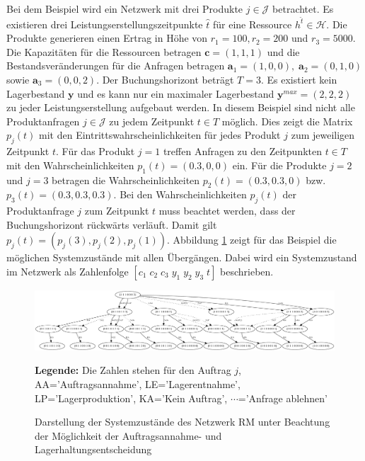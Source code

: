 Bei dem Beispiel wird ein Netzwerk mit drei Produkte $j\in\mathcal{J}$ betrachtet. Es existieren drei Leistungserstellungszeitpunkte $\hat t$ für eine Ressource $h^{\hat t}\in\mathcal{H}$. Die Produkte generieren einen Ertrag in Höhe von $r_1=100, r_2=200$ und $r_3=5000$. Die Kapazitäten für die Ressourcen betragen $\textbf{c}=(1,1,1)$ und die Bestandsveränderungen für die Anfragen betragen $\textbf{a}_1=(1,0,0),\; \textbf{a}_2=(0,1,0)$ sowie $\textbf{a}_3=(0,0,2)$. Der Buchungshorizont beträgt $T=3$. Es existiert kein Lagerbestand $\textbf{y}$ und es kann nur ein maximaler Lagerbestand $\textbf{y}^{max}=(2, 2, 2)$ zu jeder Leistungserstellung aufgebaut werden. In diesem Beispiel sind nicht alle Produktanfragen $j\in\mathcal{J}$ zu jedem Zeitpunkt $t\in T$ möglich. Dies zeigt die Matrix $p_{j}(t)$ mit den Eintrittswahrscheinlichkeiten für jedes Produkt $j$ zum jeweiligen Zeitpunkt $t$. Für das Produkt $j=1$ treffen Anfragen zu den Zeitpunkten $t\in T$ mit den Wahrscheinlichkeiten $p_{1}(t)=(0.3, 0, 0)$ ein. Für die Produkte $j=2$ und $j=3$ betragen die Wahrscheinlichkeiten $p_{2}(t)=(0.3, 0.3, 0)$ bzw. $p_{3}(t)=(0.3, 0.3, 0.3)$. Bei den Wahrscheinlichkeiten $p_j(t)$ der Produktanfrage $j$ zum Zeitpunkt $t$ muss beachtet werden, dass der Buchungshorizont rückwärts verläuft. Damit gilt $p_{j}(t)=(p_{j}(3), p_{j}(2), p_{j}(1))$. Abbildung \ref{B9} zeigt für das Beispiel die möglichen Systemzustände mit allen Übergängen. Dabei wird ein Systemzustand im Netzwerk als Zahlenfolge $[c_1\;c_2\;c_3\;y_1\;y_2\;y_3\;t]$ beschrieben.

\begin{figure}[h!]
  \begin{center}
    \includegraphics[width=200mm, angle=90]{Bilder/Beispiel9.pdf}
    \caption{Darstellung der Systemzustände des Netzwerk RM unter Beachtung der Möglichkeit der Auftragsannahme- und Lagerhaltungsentscheidung}  \label{B9}
    {\footnotesize \textbf{Legende:} Die Zahlen stehen für den Auftrag $j$, AA='Auftragsannahme', LE='Lagerentnahme', LP='Lagerproduktion', KA='Kein Auftrag', $\cdots$='Anfrage ablehnen'} 
  \end{center}
\end{figure}

